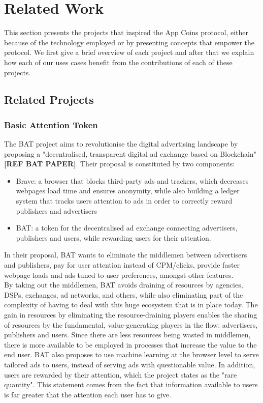 \section{Related Work}

\label{sec:related}

This section presents the projects that inspired the App Coins protocol, either because of the technology employed or by presenting concepts that empower the protocol. We first give a brief overview of each project and after that we explain how each of our uses cases benefit from the contributions of each of these projects.

\subsection{Related Projects}
\subsubsection{Basic Attention Token}

The BAT project aims to revolutionise the digital advertising landscape by proposing a "decentralised, transparent digital ad exchange based on Blockchain" \textbf{[REF BAT PAPER]}. Their proposal is constituted by two components:
\begin{itemize}
	\item Brave: a browser that blocks third-party ads and trackers, which decreases webpages load time and ensures anonymity, while also building a ledger system that tracks users attention to ads in order to correctly reward publishers and advertisers
	\item BAT: a token for the decentralised ad exchange connecting advertisers, publishers and users, while rewarding users for their attention.
\end{itemize}

In their proposal, BAT wants to eliminate the middlemen between advertisers and publishers, pay for user attention instead of CPM/clicks, provide faster webpage loads and ads tuned to user preferences, amongst other features. \\

By taking out the middlemen, BAT avoids draining of resources by agencies, DSPs, exchanges, ad networks, and others, while also eliminating part of the complexity of having to deal with this huge ecosystem that is in place today. The gain in resources by eliminating the resource-draining players enables the sharing of resources by the fundamental, value-generating  players in the flow: advertisers, publishers and users. Since there are less resources being wasted in middlemen, there is more available to be employed in processes that increase the value to the end user. BAT also proposes to use machine learning at the browser level to serve tailored ads to users, instead of serving ads with questionable value. In addition, users are rewarded by their attention, which the project states as the "rare quantity". This statement comes from the fact that information available to users is far greater that the attention each user has to give. \\

